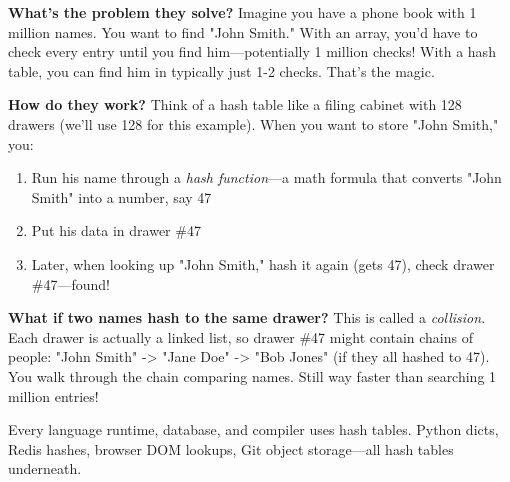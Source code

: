 \textbf{What's the problem they solve?} Imagine you have a phone book with 1 million names. You want to find "John Smith." With an array, you'd have to check every entry until you find him---potentially 1 million checks! With a hash table, you can find him in typically just 1-2 checks. That's the magic.

\textbf{How do they work?} Think of a hash table like a filing cabinet with 128 drawers (we'll use 128 for this example). When you want to store "John Smith," you:
\begin{enumerate}
    \item Run his name through a \textit{hash function}---a math formula that converts "John Smith" into a number, say 47
    \item Put his data in drawer \#47
    \item Later, when looking up "John Smith," hash it again (gets 47), check drawer \#47---found!
\end{enumerate}

\textbf{What if two names hash to the same drawer?} This is called a \textit{collision}. Each drawer is actually a linked list, so drawer \#47 might contain chains of people: "John Smith" -> "Jane Doe" -> "Bob Jones" (if they all hashed to 47). You walk through the chain comparing names. Still way faster than searching 1 million entries!

Every language runtime, database, and compiler uses hash tables. Python dicts, Redis hashes, browser DOM lookups, Git object storage---all hash tables underneath.

